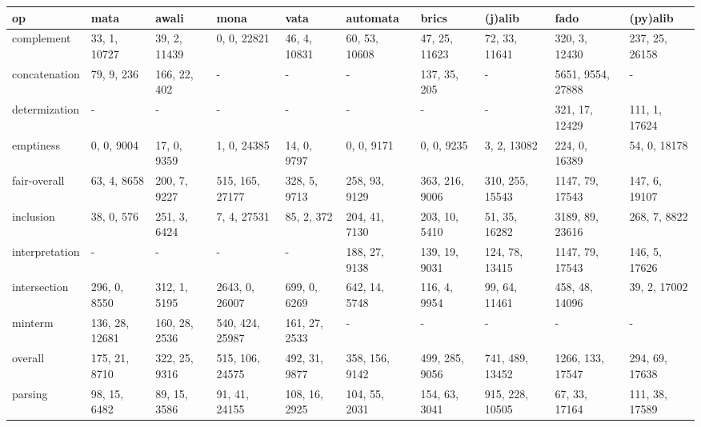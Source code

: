 \begin{tabular}{llllllllll}
\hline
 op             & mata           & awali         & mona            & vata           & automata       & brics            & (j)alib           & fado              & (py)alib          \\
\hline
 complement     & 33, 1, 10727   & 39, 2, 11439  & 0, 0, 22821     & 46, 4, 10831   & 60, 53, 10608  & 47, 25, 11623    & 72, 33, 11641     & 320, 3, 12430     & 237, 25, 26158    \\
 concatenation  & 79, 9, 236     & 166, 22, 402  & -               & -              & -              & 137, 35, 205     & -                 & 5651, 9554, 27888 & -                 \\
 determization  & -              & -             & -               & -              & -              & -                & -                 & 321, 17, 12429    & 111, 1, 17624     \\
 emptiness      & 0, 0, 9004     & 17, 0, 9359   & 1, 0, 24385     & 14, 0, 9797    & 0, 0, 9171     & 0, 0, 9235       & 3, 2, 13082       & 224, 0, 16389     & 54, 0, 18178      \\
 fair-overall   & 63, 4, 8658    & 200, 7, 9227  & 515, 165, 27177 & 328, 5, 9713   & 258, 93, 9129  & 363, 216, 9006   & 310, 255, 15543   & 1147, 79, 17543   & 147, 6, 19107     \\
 inclusion      & 38, 0, 576     & 251, 3, 6424  & 7, 4, 27531     & 85, 2, 372     & 204, 41, 7130  & 203, 10, 5410    & 51, 35, 16282     & 3189, 89, 23616   & 268, 7, 8822      \\
 interpretation & -              & -             & -               & -              & 188, 27, 9138  & 139, 19, 9031    & 124, 78, 13415    & 1147, 79, 17543   & 146, 5, 17626     \\
 intersection   & 296, 0, 8550   & 312, 1, 5195  & 2643, 0, 26007  & 699, 0, 6269   & 642, 14, 5748  & 116, 4, 9954     & 99, 64, 11461     & 458, 48, 14096    & 39, 2, 17002      \\
 minterm        & 136, 28, 12681 & 160, 28, 2536 & 540, 424, 25987 & 161, 27, 2533  & -              & -                & -                 & -                 & -                 \\
 overall        & 175, 21, 8710  & 322, 25, 9316 & 515, 106, 24575 & 492, 31, 9877  & 358, 156, 9142 & 499, 285, 9056   & 741, 489, 13452   & 1266, 133, 17547  & 294, 69, 17638    \\
 parsing        & 98, 15, 6482   & 89, 15, 3586  & 91, 41, 24155   & 108, 16, 2925  & 104, 55, 2031  & 154, 63, 3041    & 915, 228, 10505   & 67, 33, 17164     & 111, 38, 17589    \\

\end{tabular}
